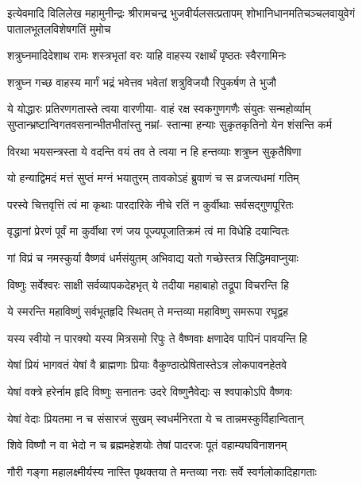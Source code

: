 \fourlineindentedshloka
{इत्येवमादि विलिलेख महामुनीन्द्रः}
{श्रीरामचन्द्र भुजवीर्यलसत्प्रतापम्}
{शोभानिधानमतिचञ्चलवायुवेगं}
{पातालभूतलविशेषगतिं मुमोच}%

\twolineshloka
{शत्रुघ्नमादिदेशाथ रामः शस्त्रभृतां वरः}
{याहि वाहस्य रक्षार्थं पृष्ठतः स्वैरगामिनः}%

\twolineshloka
{शत्रुघ्न गच्छ वाहस्य मार्गं भद्रं भवेत्तव}
{भवेतां शत्रुविजयौ रिपुकर्षण ते भुजौ}%

\fourlineindentedshloka
{ये योद्धारः प्रतिरणगतास्ते त्वया वारणीया-}
{वाहं रक्ष स्वकगुणगणैः संयुतः सन्महोर्व्याम्}
{सुप्तान्भ्रष्टान्विगतवसनान्भीतभीतांस्तु नम्रां-}
{स्तान्मा हन्याः सुकृतकृतिनो येन शंसन्ति कर्म}%

\twolineshloka
{विरथा भयसन्त्रस्ता ये वदन्ति वयं तव}
{ते त्वया न हि हन्तव्याः शत्रुघ्न सुकृतैषिणा}%

\twolineshloka
{यो हन्याद्विमदं मत्तं सुप्तं मग्नं भयातुरम्}
{तावकोऽहं ब्रुवाणं च स व्रजत्यधमां गतिम्}%

\twolineshloka
{परस्वे चित्तवृत्तिं त्वं मा कृथाः पारदारिके}
{नीचे रतिं न कुर्वीथाः सर्वसद्गुणपूरितः}%

\twolineshloka
{वृद्धानां प्रेरणं पूर्वं मा कुर्वीथा रणं जय}
{पूज्यपूजातिक्रमं त्वं मा विधेहि दयान्वितः}%

\twolineshloka
{गां विप्रं च नमस्कुर्या वैष्णवं धर्मसंयुतम्}
{अभिवाद्य यतो गच्छेस्तत्र सिद्धिमवाप्नुयाः}%

\twolineshloka
{विष्णुः सर्वेश्वरः साक्षी सर्वव्यापकदेहभृत्}
{ये तदीया महाबाहो तद्रूपा विचरन्ति हि}%

\twolineshloka
{ये स्मरन्ति महाविष्णुं सर्वभूतहृदि स्थितम्}
{ते मन्तव्या महाविष्णु समरूपा रघूद्वह}%

\twolineshloka
{यस्य स्वीयो न पारक्यो यस्य मित्रसमो रिपुः}
{ते वैष्णवाः क्षणादेव पापिनं पावयन्ति हि}%

\twolineshloka
{येषां प्रियं भागवतं येषां वै ब्राह्मणाः प्रियाः}
{वैकुण्ठात्प्रेषितास्तेऽत्र लोकपावनहेतवे}%

\twolineshloka
{येषां वक्त्रे हरेर्नाम हृदि विष्णुः सनातनः}
{उदरे विष्णुनैवेद्यः स श्वपाकोऽपि वैष्णवः}%

\twolineshloka
{येषां वेदाः प्रियतमा न च संसारजं सुखम्}
{स्वधर्मनिरता ये च तान्नमस्कुर्विहान्वितान्}%

\twolineshloka
{शिवे विष्णौ न वा भेदो न च ब्रह्ममहेशयोः}
{तेषां पादरजः पूतं वहाम्यघविनाशनम्}%

\twolineshloka
{गौरी गङ्गा महालक्ष्मीर्यस्य नास्ति पृथक्तया}
{ते मन्तव्या नराः सर्वे स्वर्गलोकादिहागताः}%

